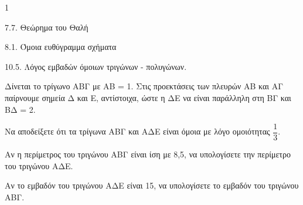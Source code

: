 \begin{ylh}{1}
    \item 7.7. Θεώρημα του Θαλή
    \item 8.1. Όμοια ευθύγραμμα σχήματα
    \item 10.5. Λόγος εμβαδών όμοιων τριγώνων - πολυγώνων.
\end{ylh}
\begin{figure} %
    \centering
\end{figure}
Δίνεται το τρίγωνο ΑΒΓ με ΑΒ = 1. Στις προεκτάσεις των πλευρών ΑΒ και ΑΓ παίρνουμε σημεία Δ και Ε, αντίστοιχα, ώστε η ΔΕ να είναι παράλληλη στη ΒΓ και ΒΔ = 2.
\begin{alist}
\item Να αποδείξετε ότι τα τρίγωνα ΑΒΓ και ΑΔΕ είναι όμοια με λόγο ομοιότητας $\dfrac{1}{3}$. 
\item Αν η περίμετρος του τριγώνου ΑΒΓ είναι ίση με 8,5, να υπολογίσετε την περίμετρο του τριγώνου ΑΔΕ. 
\item Αν το εμβαδόν του τριγώνου ΑΔΕ είναι 15, να υπολογίσετε το εμβαδόν του τριγώνου ΑΒΓ. 
\end{alist}